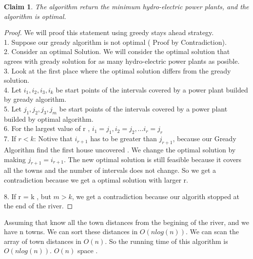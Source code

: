 \documentclass[11 pt]{article}
\newtheorem{claim}[theorem]{Claim}
\begin{document}
\begin {claim}
The  algorithm return the minimum hydro-electric power plants, and the algorithm is optimal.
\end {claim}

\begin {proof}
We will proof this statement using greedy stays ahead strategy.\\
1. Suppose our gready algorithm is not optimal ( Proof by Contradiction).\\
2. Consider an optimal Solution. We will consider the optimal solution that agrees with gready solution for as many hydro-electric power plants as posible.\\
3.  Look at the first place where the optimal solution differs from the gready solution.\\
4. Let $ i_1, i_2, i_3 , i_k $ be start points of the intervals covered by a power plant builded by gready algorithm.\\
5. Let $ j_1, j_2, j_3,  j_ m $ be start points of the intervals covered by a power plant builded by optimal  algorithm.\\
6. For the largest value of r ,  $i_1 = j_1, i_2 = j_2,  ... i_r = j_r$ \\
7. If $r <  k$:  Notive that  $i_{r+1}$ has to be greater than $j_{r+1}$, because our Gready Algorithm find the first house uncovered .  We change the optimal solution by making $j_{r+1} = i_{r+1}$. The new optimal solution is still feasible because it covers all the towns and the number of intervals does not change. So we get a contradiction because we get a optimal solution with larger r. 

8. If r = k , but $m > k$, we get a contradiction because our algorith stopped at the end of the river. 

\end {proof} 

Assuming that know all the town distances from the begining of the river, and we have n towns. We can sort these distances in $O (nlog(n))$. We can scan the array of town distances in $O(n)$. So the running time of this algorithm is $O (nlog(n))$.  $O(n) $ space .
\end{document}
